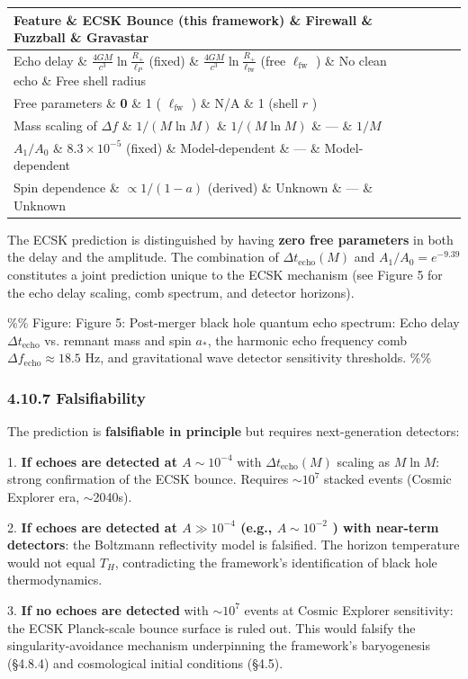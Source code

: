 \documentclass[11pt,a4paper]{article}
\theoremstyle{definition}\newtheorem{definition}{Definition}
\theoremstyle{remark}\newtheorem{remark}{Remark}
\begin{document}
\begin{longtable}{lllll}
\hline
Feature \& ECSK Bounce (this framework) \& Firewall \& Fuzzball \& Gravastar \\
\hline
Echo delay \& $\frac{4GM}{c^3}\ln\frac{R_+}{\ell_P}$ (fixed) \& $\frac{4GM}{c^3}\ln\frac{R_+}{\ell_{\text{fw}}}$ (free $\ell_{\text{fw}}$ ) \& No clean echo \& Free shell radius \\
Free parameters \& \textbf{0} \& 1 ( $\ell_{\text{fw}}$ ) \& N/A \& 1 (shell $r$ ) \\
Mass scaling of $\Delta f$ \& $1/(M \ln M)$ \& $1/(M \ln M)$ \& — \& $1/M$ \\
$A_1/A_0$ \& $8.3 \times 10^{-5}$ (fixed) \& Model-dependent \& — \& Model-dependent \\
Spin dependence \& $\propto 1/(1-a)$ (derived) \& Unknown \& — \& Unknown \\
\hline
\end{longtable}
The ECSK prediction is distinguished by having \textbf{zero free parameters} in both the delay and the amplitude. The combination of $\Delta t_{\text{echo}}(M)$ and $A_1/A_0 = e^{-9.39}$ constitutes a joint prediction unique to the ECSK mechanism (see Figure 5 for the echo delay scaling, comb spectrum, and detector horizons).

\%\% Figure: Figure 5: Post-merger black hole quantum echo spectrum: Echo delay $\Delta t_{\text{echo}}$ vs. remnant mass and spin $a_*$, the harmonic echo frequency comb $\Delta f_{\text{echo}} \approx 18.5\text{ Hz}$, and gravitational wave detector sensitivity thresholds. \%\%
\subsubsection{4.10.7 Falsifiability}

The prediction is \textbf{falsifiable in principle} but requires next-generation detectors:

1. \textbf{If echoes are detected at $A \sim 10^{-4}$} with $\Delta t_{\text{echo}}(M)$ scaling as $M \ln M$: strong confirmation of the ECSK bounce. Requires $\sim 10^7$ stacked events (Cosmic Explorer era, $\sim$2040s).

2. \textbf{If echoes are detected at $A \gg 10^{-4}$ (e.g., $A \sim 10^{-2}$ ) with near-term detectors}: the Boltzmann reflectivity model is falsified. The horizon temperature would not equal $T_H$, contradicting the framework's identification of black hole thermodynamics.

3. \textbf{If no echoes are detected} with $\sim 10^7$ events at Cosmic Explorer sensitivity: the ECSK Planck-scale bounce surface is ruled out. This would falsify the singularity-avoidance mechanism underpinning the framework's baryogenesis (§4.8.4) and cosmological initial conditions (§4.5).
\end{document}

